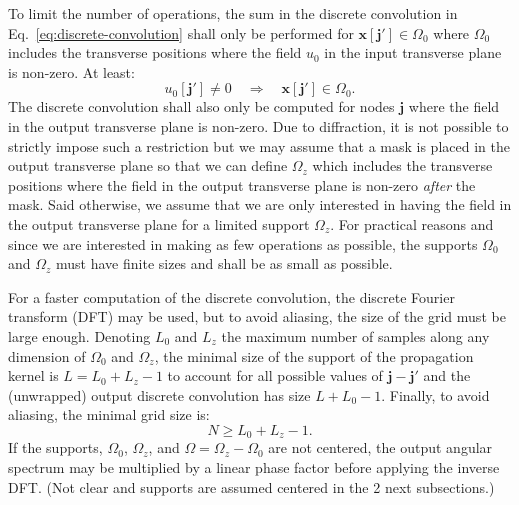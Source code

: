\documentclass[a4paper]{article}
\newcommand{\oops}[1]{{\color{purple}#1}}
\newcommand*{\V}[1]{\boldsymbol{#1}}
\newcommand*{\Set}[1]{\mathbb{#1}}
\begin{document}
To limit the number of operations, the sum in the discrete convolution in
Eq.~\eqref{eq:discrete-convolution} shall only be performed for
$\V{x}[\V{j}'] ∈ Ω_{0}$ where $Ω_{0}$ includes the transverse positions where
the field $u_{0}$ in the input transverse plane is non-zero. At least:
\begin{equation}
  \label{eq:input-field-support}
  u_{0}[\V{j}']
  \not= 0
  \quad\Longrightarrow\quad
  \V{x}[\V{j}'] ∈ Ω_{0}.
\end{equation}
The discrete convolution shall also only be computed for nodes $\V{j}$ where
the field in the output transverse plane is non-zero. Due to diffraction, it is
not possible to strictly impose such a restriction but we may assume that a
mask is placed in the output transverse plane so that we can define $Ω_{z}$
which includes the transverse positions where the field in the output
transverse plane is non-zero \emph{after} the mask. Said otherwise, we assume
that we are only interested in having the field in the output transverse plane
for a limited support $Ω_{z}$. For practical reasons and since we are
interested in making as few operations as possible, the supports $Ω_{0}$ and
$Ω_{z}$ must have finite sizes and shall be as small as possible.

For a faster computation of the discrete convolution, the discrete Fourier
transform (DFT) may be used, but to avoid aliasing, the size of the grid must
be large enough. Denoting $L_{0}$ and $L_{z}$ the maximum number of samples
along any dimension of $Ω_{0}$ and $Ω_{z}$, the minimal size of the support of
the propagation kernel is $L = L_{0} + L_{z} - 1$ to account for all possible
values of $\V{j} - \V{j}'$ and the (unwrapped) output discrete convolution has
size $L + L_{0} - 1$. Finally, to avoid aliasing, the minimal grid size is:
\begin{equation}
  \label{eq:convolution-grid-size}
  N ≥ L_{0} + L_{z} - 1.
\end{equation}
If the supports, $Ω_{0}$, $Ω_{z}$, and $Ω = Ω_{z} - Ω_{0}$ are not centered,
the output angular spectrum may be multiplied by a linear phase factor before
applying the inverse DFT. \oops{(Not clear and supports are assumed centered in
  the 2 next subsections.)}
\end{document}
